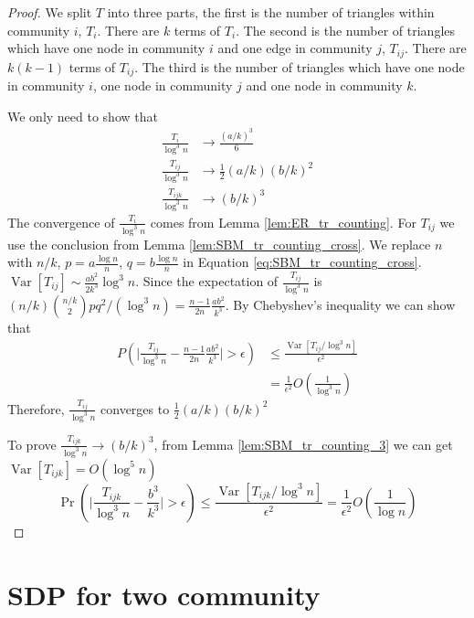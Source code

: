 \documentclass{ctexart}
\DeclareMathOperator{\Var}{Var}
\begin{document}
\begin{proof}
	We split $T$ into three parts, the first is the number of triangles within community $i$, $T_i$. There are $k$ terms of $T_i$.
	The second is the number of triangles which have one node in community $i$ and one edge in community $j$, $T_{ij}$. There are $k(k-1)$ terms of $T_{ij}$. The third is the number of triangles which have one node in community $i$, one node in community $j$ and one node in community $k$.
	
	We only need to show that
	\begin{align}
	\frac{T_i}{\log ^3 n} &\to \frac{(a/k)^3}{6} \\
	\frac{T_{ij}}{\log^3 n}& \to \frac{1}{2}(a/k)(b/k)^2\\
	\frac{T_{ijk}}{\log^3 n} & \to (b/k)^3
	\end{align}
	The convergence of $\frac{T_i}{\log ^3 n}$ comes from Lemma \ref{lem:ER_tr_counting}.
	For $T_{ij}$ we use the conclusion from Lemma \ref{lem:SBM_tr_counting_cross}.
	We replace $n$ with $n/k$, $p=a\frac{\log n}{n}$, $q=b\frac{\log n}{n}$ in Equation \eqref{eq:SBM_tr_counting_cross}.
$\Var[T_{ij}] \sim \frac{ab^2}{2k^3} \log^3 n$. Since the expectation of $\frac{T_{ij}}{\log^3 n}$ is $(n/k)\binom{n/k}{2}pq^2/(\log^3 n)
=\frac{n-1}{2n}\frac{ab^2}{k^3}$. By Chebyshev's inequality we can show that 
\begin{align*}
P( \Big|\frac{T_{ij}}{\log^3 n} - \frac{n-1}{2n}\frac{ab^2}{k^3} \Big| > \epsilon) &\leq \frac{\Var[T_{ij} / \log^3 n]}{\epsilon^2} \\
& = \frac{1}{\epsilon^2}
O(\frac{1}{\log^3 n})
\end{align*}
	Therefore, $\frac{T_{ij}}{\log^3 n} $ converges to $\frac{1}{2}(a/k)(b/k)^2$
	
	To prove $\frac{T_{ijk}}{\log^3 n}\to (b/k)^3$, from Lemma \ref{lem:SBM_tr_counting_3} we can get $\Var[T_{ijk}] = O(\log^5 n)$
$$
\Pr( \Big|\frac{T_{ijk}}{\log^3 n} -\frac{b^3}{k^3} \Big| > \epsilon) \leq \frac{\Var[T_{ijk} / \log^3 n]}{\epsilon^2} = \frac{1}{\epsilon^2}
O(\frac{1}{\log n})
$$
\end{proof}
\section{SDP for two community}
\end{document}
